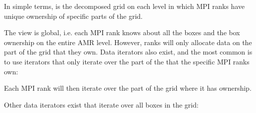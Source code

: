 \documentclass[letterpaper,10pt,english]{sphinxmanual}
\begin{document}
\begin{sphinxVerbatim}[commandchars=\\\{\},formatcom=\scriptsize]
   
   

  
\end{sphinxVerbatim}

\sphinxAtStartPar
In simple terms,   is the decomposed grid on each level in which MPI ranks have unique ownership of specific parts of the grid.

\sphinxAtStartPar
The  view is global, i.e. each MPI rank knows about all the boxes and the box ownership on the entire AMR level.
However, ranks will only allocate data on the part of the grid that they own.
Data iterators also exist, and the most common is to use iterators that only iterate over the part of the  that the specific MPI ranks own:

\begin{sphinxVerbatim}[commandchars=\\\{\},formatcom=\scriptsize]
 
    
\end{sphinxVerbatim}

\sphinxAtStartPar
Each MPI rank will then iterate  over the part of the grid where it has ownership.

\sphinxAtStartPar
Other data iterators exist that iterate over all boxes in the grid:

\begin{sphinxVerbatim}[commandchars=\\\{\},formatcom=\scriptsize]
      
\end{sphinxVerbatim}
\end{document}
